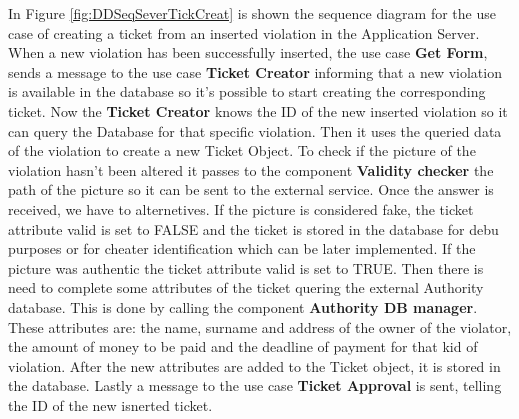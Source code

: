 In Figure \ref{fig:DDSeqSeverTickCreat} is shown the sequence diagram for the use case of creating a ticket from an inserted violation in the Application Server.
When a new violation has been successfully inserted, the use case \textbf{Get Form}, sends a message to the use case \textbf{Ticket Creator} informing that a new violation is available in the database so it's possible to start creating the corresponding ticket. Now the \textbf{Ticket Creator} knows the ID of the new inserted violation so it can query the Database for that specific violation. Then it uses the queried data of the violation to create a new Ticket Object. To check if the picture of the violation hasn't been altered it passes to the component \textbf{Validity checker} the path of the picture so it can be sent to the external service. Once the answer is received, we have to alternetives. If the picture is considered fake, the ticket attribute \textcolor{poliblue}{valid} is set to FALSE and the ticket is stored in the database for debu purposes or for cheater identification which can be later implemented.
If the picture was authentic the ticket attribute \textcolor{poliblue}{valid} is set to TRUE. Then there is need to complete some attributes of the ticket quering the external Authority database. This is done by calling the component \textbf{Authority DB manager}. These attributes are: the name, surname and address of the owner of the violator, the amount of money to be paid and the deadline of payment for that kid of violation. After the new attributes are added to the Ticket object, it is stored in the database. Lastly a message to the use case \textbf{Ticket Approval} is sent, telling the ID of the new isnerted ticket.

